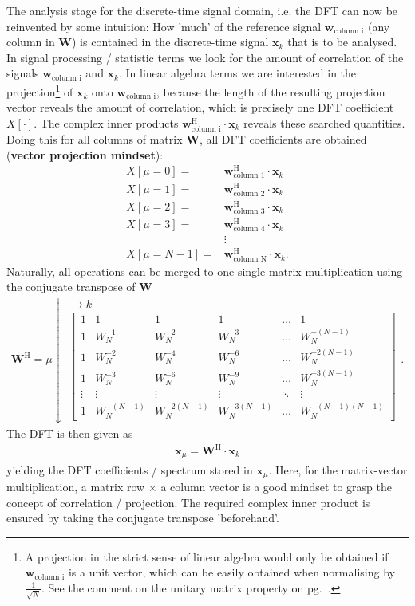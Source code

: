 \documentclass[11pt,a4paper,DIV=12]{scrartcl}
\begin{document}
The analysis stage for the discrete-time signal domain, i.e. the DFT
can now be reinvented by some intuition:
How 'much' of the reference signal $\bm{w}_{\text{column i}}$
(any column in $\bm{W}$)
is contained in the discrete-time signal $\bm{x}_k$ that is to be analysed.
%
In signal processing / statistic terms we look for the amount of correlation
of the signals
$\bm{w}_{\text{column i}}$ and $\bm{x}_k$.
%
In linear algebra terms we are interested in the projection\footnote{
A projection in the strict sense of linear algebra would only be obtained
if $\bm{w}_{\text{column i}}$
is a unit vector, which can be easily obtained when normalising by
$\frac{1}{\sqrt{N}}$. See the comment on the unitary matrix property
on pg.~\pageref{pg:unitary}.}
of $\bm{x}_k$ onto
$\bm{w}_{\text{column i}}$, because the length of the resulting projection vector
reveals the amount of correlation, which is precisely one DFT coefficient $X[\cdot]$.
%
The complex inner products $\bm{w}_{\text{column i}}^\text{H} \cdot \bm{x}_k$
reveals these searched quantities.
%
Doing this for all columns of matrix $\bm W$, all DFT coefficients are obtained
(\textbf{vector projection mindset}):
\begin{align}
X[\mu=0] =& \bm{w}_{\text{column 1}}^\text{H} \cdot \bm{x}_k\\
X[\mu=1] =& \bm{w}_{\text{column 2}}^\text{H} \cdot \bm{x}_k\\
X[\mu=2] =& \bm{w}_{\text{column 3}}^\text{H} \cdot \bm{x}_k\\
X[\mu=3] =& \bm{w}_{\text{column 4}}^\text{H} \cdot \bm{x}_k\\
&\vdots\\
X[\mu=N-1] =& \bm{w}_{\text{column N}}^\text{H} \cdot \bm{x}_k.
\end{align}
%
Naturally, all operations can be merged to one single
matrix multiplication using the conjugate transpose of $\bm W$
%
\begin{align}
\bm{W}^\text{H} =
\mu \downarrow
\substack{\rightarrow k\\
\begin{bmatrix}
1 & 1 & 1 & 1 & \dots & 1\\[1em]
1 & W_N^{-1} & W_N^{-2} & W_N^{-3} & \dots & W_N^{-(N-1)}\\[1em]
1 & W_N^{-2} & W_N^{-4} & W_N^{-6} & \dots & W_N^{-2(N-1)}\\[1em]
1 & W_N^{-3} & W_N^{-6} & W_N^{-9} & \dots & W_N^{-3(N-1)}\\[1em]
\vdots & \vdots & \vdots &\vdots &\ddots & \vdots\\[1em]
1 & W_N^{-(N-1)} & W_N^{-2(N-1)} & W_N^{-3(N-1)} & \dots & W_N^{-(N-1)(N-1)}
\end{bmatrix}
}.
\end{align}
%
The DFT is then given as
\begin{align}
\label{eq:DFT_as_Matrix}
\bm{x}_\mu = \bm{W}^\text{H} \cdot \bm{x}_k
\end{align}
yielding the DFT coefficients / spectrum stored in $\bm{x}_\mu$.
%
Here, for the matrix-vector multiplication, a matrix row $\times$ a column vector
is a good mindset to grasp the concept of correlation / projection.
%
The required complex inner product is ensured by taking the conjugate transpose
'beforehand'.
\end{document}
